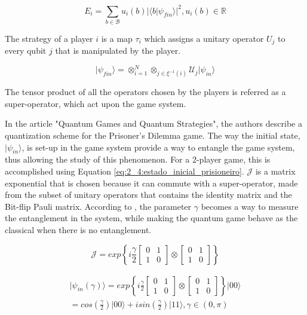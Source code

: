 \documentclass[10pt,twocolumn]{llncs}
\begin{document}
\begin{equation}
E_{i}=\sum_{b \in \mathcal{B}} u_{i}(b)\vert \langle b\vert \psi_{fin}\rangle\vert^{2}, u_{i}(b) \in \mathbb{R}
\label{eq:quantum_game_definition_payoff_func}
\end{equation}

The strategy of a player $i$ is a map $\tau_{i}$ which assigns a
unitary operator $U_{j}$ to every qubit $j$ that is manipulated
by the player.

\begin{equation}
\vert\psi_{fin}\rangle=\otimes_{i=1}^{N}\otimes_{j\in\xi^{-1}(i)}\mathcal{U}_{j}\vert\psi_{in}\rangle
\label{eq:quantum_game_definition_move}
\end{equation}

The tensor product of all the operators chosen by the players is referred as a super-operator, which act upon the game system.

In the article "Quantum Games and Quantum Strategies"\cite{Eisert2008}, the authors describe a quantization scheme for the Prisoner's Dilemma game. The way the initial state, $\vert\psi_{in}\rangle$, is set-up in the game system provide a way to entangle the game system, thus allowing the study of this phenomenon. For a $2$-player game, this is accomplished using Equation \ref{eq:2_4:estado_inicial_prisioneiro}. $\mathcal{J}$ is a matrix exponential that is chosen because it can commute with a super-operator, made from the subset of unitary operators that contains the identity matrix and the Bit-flip Pauli matrix\cite{citeulike:10961388}. According to \cite{Eisert2008}, the parameter $\gamma$ becomes a way to measure the entanglement in the system, while making the quantum game behave as the classical when there is no entanglement.

\begin{equation}
\label{eq:2_4:matrix_exponencial_esoterica}
\mathcal{J}=exp\left\{ i\frac{\gamma}{2}\left[\begin{array}{cc}
0 & 1\\
1 & 0
\end{array}\right]\otimes\left[\begin{array}{cc}
0 & 1\\
1 & 0
\end{array}\right]\right\}
\end{equation} 

\begin{equation}
\label{eq:2_4:estado_inicial_prisioneiro}
\begin{split}
\vert\psi_{in}(\gamma)\rangle=exp\left\{ i\frac{\gamma}{2}\left[\begin{array}{cc}
0 & 1\\
1 & 0
\end{array}\right]\otimes\left[\begin{array}{cc}
0 & 1\\
1 & 0
\end{array}\right]\right\} \vert00\rangle \\
=cos(\frac{\gamma}{2})\vert00\rangle+isin(\frac{\gamma}{2})\vert11\rangle,\gamma\in(0,\pi)
\end{split}
\end{equation}
\end{document}
